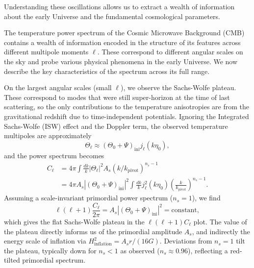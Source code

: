 \documentclass{aa}
\numberwithin{equation}{section}
\numberwithin{table}{section}
\numberwithin{figure}{section}
\begin{document}
Understanding these oscillations allows us to extract a wealth of information about the early Universe and the fundamental cosmological parameters.


The temperature power spectrum of the Cosmic Microwave Background (CMB) contains a wealth of information encoded in the structure of its features across different multipole moments $\ell$. These correspond to different angular scales on the sky and probe various physical phenomena in the early Universe. We now describe the key characteristics of the spectrum across its full range.

On the largest angular scales (small $\ell$), we observe the Sachs-Wolfe plateau. These correspond to modes that were still super-horizon at the time of last scattering, so the only contributions to the temperature anisotropies are from the gravitational redshift due to time-independent potentials. Ignoring the Integrated Sachs-Wolfe (ISW) effect and the Doppler term, the observed temperature multipoles are approximately
\begin{equation}
\Theta_\ell \approx (\Theta_0 + \Psi)_\text{ini} j_\ell(k\eta_0),
\end{equation}
and the power spectrum becomes
\begin{align}
C_\ell &= 4\pi \int \frac{dk}{k} |\Theta_\ell|^2 A_s(k/k_\text{pivot})^{n_s - 1} \\
&= 4\pi A_s |(\Theta_0 + \Psi)_\text{ini}|^2 \int \frac{dk}{k} j_\ell^2(k\eta_0) \left( \frac{k}{k_\text{pivot}} \right)^{n_s - 1}.
\end{align}
Assuming a scale-invariant primordial power spectrum ($n_s = 1$), we find
\begin{equation}
\ell(\ell + 1)\frac{C_\ell}{2\pi} = A_s |(\Theta_0 + \Psi)_\text{ini}|^2 = \text{constant},
\end{equation}
which gives the flat Sachs-Wolfe plateau in the $\ell(\ell+1)C_\ell$ plot. The value of the plateau directly informs us of the primordial amplitude $A_s$, and indirectly the energy scale of inflation via $H_\text{inflation}^2 = A_s r / (16G)$. Deviations from $n_s = 1$ tilt the plateau, typically down for $n_s < 1$ as observed ($n_s \approx 0.96$), reflecting a red-tilted primordial spectrum.
\end{document}
